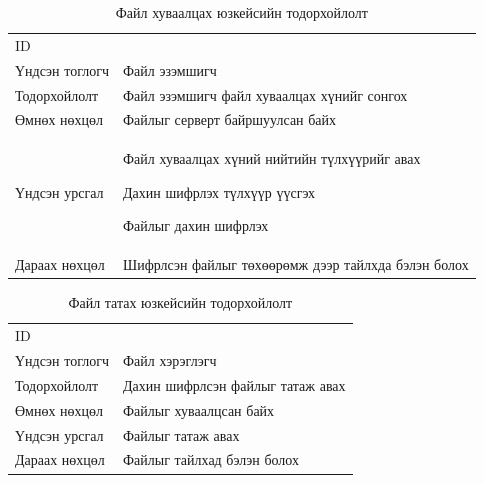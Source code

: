 \begin{table}
    \label{tab:treatments}
    \footnotesize
    \centering
    \begin{tabularx}{\textwidth}{|>{\hsize=0.3\hsize}X|>{\hsize=0.7\hsize}X|}
        \hline
        \multicolumn{2}{|c|}{Файл хуваалцах} \\
        \hline
        ID & 5 \\
        \hline
        Үндсэн тоглогч & Файл эзэмшигч\\
        \hline
        Тодорхойлолт & Файл эзэмшигч файл хуваалцах хүнийг сонгох\\
        \hline
        Өмнөх нөхцөл & Файлыг серверт байршуулсан байх\\
        \hline
        Үндсэн урсгал &
            \item Файл хуваалцах хүний нийтийн түлхүүрийг авах
            \item Дахин шифрлэх түлхүүр үүсгэх
            \item Файлыг дахин шифрлэх\\
        \hline
        Дараах нөхцөл & Шифрлсэн файлыг төхөөрөмж дээр тайлхда бэлэн болох\\
        \hline
    \end{tabularx}
    \caption{Файл хуваалцах юзкейсийн тодорхойлолт}
\end{table}

\begin{table}
    \label{tab:treatments}
    \footnotesize
    \centering
    \begin{tabularx}{\textwidth}{|>{\hsize=0.3\hsize}X|>{\hsize=0.7\hsize}X|}
        \hline
        \multicolumn{2}{|c|}{Файл татах} \\
        \hline
        ID & 6 \\
        \hline
        Үндсэн тоглогч & Файл хэрэглэгч\\
        \hline
        Тодорхойлолт & Дахин шифрлсэн файлыг татаж авах\\
        \hline
        Өмнөх нөхцөл & Файлыг хуваалцсан байх\\
        \hline
        Үндсэн урсгал & Файлыг татаж авах\\
        \hline
        Дараах нөхцөл & Файлыг тайлхад бэлэн болох\\
        \hline
    \end{tabularx}
    \caption{Файл татах юзкейсийн тодорхойлолт}
\end{table}

